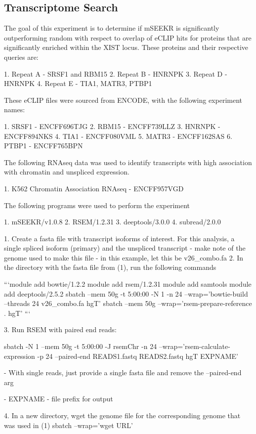 \subsection{Transcriptome Search}
The goal of this experiment is to determine if mSEEKR is significantly outperforming random with respect to overlap of eCLIP hits for proteins that are significantly enriched within the XIST locus. These proteins and their respective queries are:

1. Repeat A - SRSF1 and RBM15
2. Repeat B - HNRNPK
3. Repeat D - HNRNPK
4. Repeat E - TIA1, MATR3, PTBP1

These eCLIP files were sourced from ENCODE, with the following experiment names:

1. SRSF1 - ENCFF696TJG
2. RBM15 - ENCFF739LLZ
3. HNRNPK - ENCFF894NKS
4. TIA1 - ENCFF080VML
5. MATR3 - ENCFF162SAS
6. PTBP1 - ENCFF765BPN


The following RNAseq data was used to identify transcripts with high association with chromatin and unspliced expression.

1. K562 Chromatin Association RNAseq - ENCFF957VGD


The following programs were used to perform the experiment

1. mSEEKR/v1.0.8
2. RSEM/1.2.31
3. deeptools/3.0.0
4. subread/2.0.0

1. Create a fasta file with transcript isoforms of interest. For this analysis, a single spliced isoform (primary) and the unspliced transcript
  - make note of the genome used to make this file
  - in this example, let this be v26_combo.fa
2. In the directory with the fasta file from (1), run the following commands

```module add bowtie/1.2.2
module add rsem/1.2.31
module add samtools
module add deeptools/2.5.2
sbatch --mem 50g -t 5:00:00 -N 1 -n 24 --wrap='bowtie-build --threads 24 v26_combo.fa hgT'
sbatch --mem 50g --wrap='rsem-prepare-reference . hgT'
```

3. Run RSEM with paired end reads:

sbatch -N 1 --mem 50g -t 5:00:00 -J rsemChr -n 24 --wrap='rsem-calculate-expression -p 24 --paired-end READS1.fastq READS2.fastq  hgT EXPNAME'


- With single reads, just provide a single fasta file and remove the --paired-end arg

- EXPNAME - file prefix for output


4. In a new directory, wget the genome file for the corresponding genome that was used in (1)
  sbatch --wrap='wget URL'

